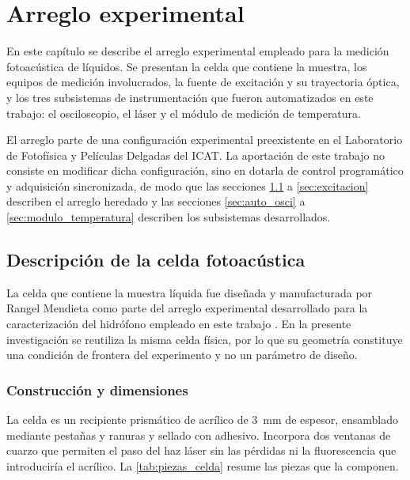 \chapter{Arreglo experimental}
\label{cap:arreglo}

En este capítulo se describe el arreglo experimental empleado para la
medición fotoacústica de líquidos. Se presentan la celda que contiene
la muestra, los equipos de medición involucrados, la fuente de
excitación y su trayectoria óptica, y los tres subsistemas de
instrumentación que fueron automatizados en este trabajo: el
osciloscopio, el láser y el módulo de medición de temperatura.

El arreglo parte de una configuración experimental preexistente en el
Laboratorio de Fotofísica y Películas Delgadas del ICAT. La aportación
de este trabajo no consiste en modificar dicha configuración, sino en
dotarla de control programático y adquisición sincronizada, de modo
que las secciones \ref{sec:celda} a \ref{sec:excitacion} describen el
arreglo heredado y las secciones \ref{sec:auto_osci} a
\ref{sec:modulo_temperatura} describen los subsistemas desarrollados.

\section{Descripción de la celda fotoacústica}
\label{sec:celda}

La celda que contiene la muestra líquida fue diseñada y manufacturada
por Rangel Mendieta como parte del arreglo experimental desarrollado
para la caracterización del hidrófono empleado en este trabajo
\cite{Rangel2023}. En la presente investigación se reutiliza la misma
celda física, por lo que su geometría constituye una condición de
frontera del experimento y no un parámetro de diseño.

\subsection*{Construcción y dimensiones}

La celda es un recipiente prismático de acrílico de \SI{3}{\milli\meter}
de espesor, ensamblado mediante pestañas y ranuras y sellado con
adhesivo. Incorpora dos ventanas de cuarzo que permiten el paso del haz
láser sin las pérdidas ni la fluorescencia que introduciría el
acrílico. La \cref{tab:piezas_celda} resume las piezas que la componen.

